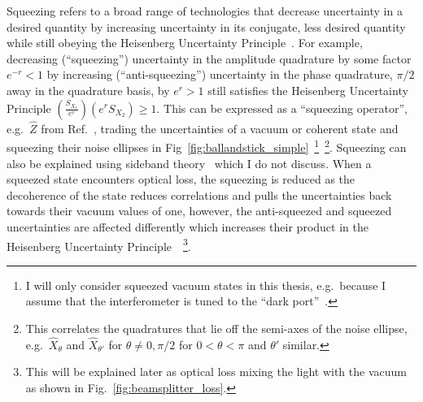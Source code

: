Squeezing refers to a broad range of technologies that decrease uncertainty in a desired quantity by increasing uncertainty in its conjugate, less desired quantity while still obeying the Heisenberg Uncertainty Principle~\cite{}. For example, decreasing (``squeezing'') uncertainty in the amplitude quadrature by some factor $e^{-r}<1$ by increasing (``anti-squeezing'') uncertainty in the phase quadrature, $\pi/2$ away in the quadrature basis, by $e^r>1$ still satisfies the Heisenberg Uncertainty Principle $(\frac{S_{X_1}}{e^r}) (e^rS_{X_2})\geq1$.
This can be expressed as a ``squeezing operator'', e.g.\ $\hat Z$ from Ref.~\cite{}, trading the uncertainties of a vacuum or coherent state and squeezing their noise ellipses in Fig~\ref{fig:ballandstick_simple}~\footnote{I will only consider squeezed vacuum states in this thesis, e.g.\ because I assume that the interferometer is tuned to the ``dark port''~\cite{}.}~\footnote{This correlates the quadratures that lie off the semi-axes of the noise ellipse, e.g.\ $\hat{X}_\theta$ and $\hat{X}_{\theta'}$ for $\theta\neq0,\pi/2$ for $0<\theta<\pi$ and $\theta'$ similar.}.
Squeezing can also be explained using sideband theory~\cite{} which I do not discuss.
When a squeezed state encounters optical loss, the squeezing is reduced as the decoherence of the state reduces correlations and pulls the uncertainties back towards their vacuum values of one, however, the anti-squeezed and squeezed uncertainties are affected differently which increases their product in the Heisenberg Uncertainty Principle~\cite{}~\footnote{This will be explained later as optical loss mixing the light with the vacuum as shown in Fig.~\ref{fig:beamsplitter_loss}.}. %

